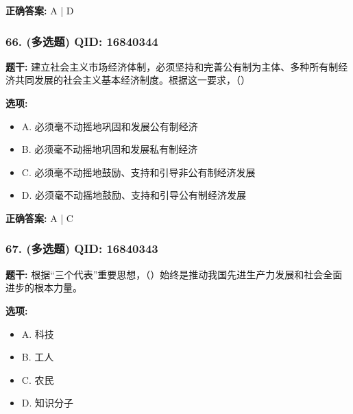 \documentclass[12pt,UTF8]{ctexart}
\begin{document}
\textbf{正确答案:}
A | D

\vspace{0.3em}\hrulefill\vspace{0.7em}

\subsubsection*{66. (多选题) \small QID: 16840344}

\textbf{题干:}
建立社会主义市场经济体制，必须坚持和完善公有制为主体、多种所有制经济共同发展的社会主义基本经济制度。根据这一要求，（）

\textbf{选项:}
\begin{itemize}[leftmargin=*]

  \item A. 必须毫不动摇地巩固和发展公有制经济

  \item B. 必须毫不动摇地巩固和发展私有制经济

  \item C. 必须毫不动摇地鼓励、支持和引导非公有制经济发展

  \item D. 必须毫不动摇地鼓励、支持和引导公有制经济发展

\end{itemize}

\textbf{正确答案:}
A | C

\vspace{0.3em}\hrulefill\vspace{0.7em}

\subsubsection*{67. (多选题) \small QID: 16840343}

\textbf{题干:}
根据“三个代表”重要思想，（）始终是推动我国先进生产力发展和社会全面进步的根本力量。

\textbf{选项:}
\begin{itemize}[leftmargin=*]

  \item A. 科技

  \item B. 工人

  \item C. 农民

  \item D. 知识分子

\end{itemize}
\end{document}
